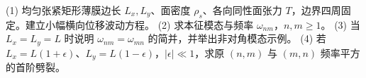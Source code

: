 (1) 均匀张紧矩形薄膜边长 \(L_x,L_y\)、面密度 \(\rho_s\)、各向同性面张力 \(T\)，边界四周固定。建立小幅横向位移波动方程。
(2) 求本征模态与频率 \(\omega_{nm}\)，\(n,m\ge1\)。
(3) 当 \(L_x=L_y=L\) 时说明 \(\omega_{nm}=\omega_{mn}\) 的简并，并举出非对角模态示例。
(4) 若 \(L_x=L(1+\epsilon)\)、\(L_y=L(1-\epsilon)\)，\(|\epsilon|\ll1\)，求原 \((n,m)\) 与 \((m,n)\) 频率平方的首阶劈裂。
